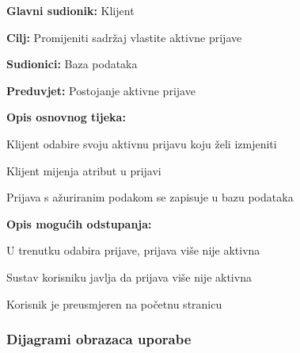 					\noindent {}
					\begin{packed_item}
	
						\item \textbf{Glavni sudionik: }Klijent
						\item  \textbf{Cilj:} Promijeniti sadržaj vlastite aktivne prijave
						\item  \textbf{Sudionici:} Baza podataka
						\item  \textbf{Preduvjet:} Postojanje aktivne prijave
						\item  \textbf{Opis osnovnog tijeka:}
						
						\item[] \begin{packed_enum}
	
							\item Klijent odabire svoju aktivnu prijavu koju želi izmjeniti
							\item Klijent mijenja atribut u prijavi
							\item Prijava s ažuriranim podakom se zapisuje u bazu podataka
						\end{packed_enum}
						
						\item  \textbf{Opis mogućih odstupanja:}
						
						\item[] \begin{packed_item}
	
							\item[1.a] U trenutku odabira prijave, prijava više nije aktivna
							\item[] \begin{packed_enum}
								
								\item Sustav korisniku javlja da prijava više nije aktivna	
								\item Korisnik je preusmjeren na početnu stranicu
							\end{packed_enum}
						\end{packed_item}
					\end{packed_item}
					
					
				
				
					
				\subsubsection{Dijagrami obrazaca uporabe}
					
